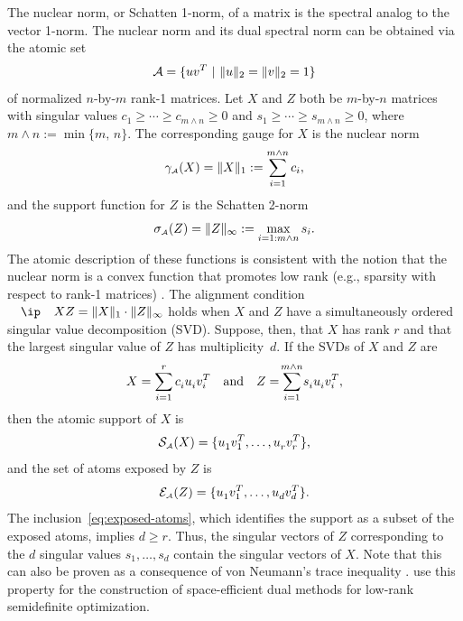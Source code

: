   \begin{example} \label{example-nuclear-norm}

    The nuclear norm, or Schatten 1-norm, of a matrix is the spectral analog to
    the vector 1-norm. The nuclear norm and its dual spectral norm can be obtained
    via the atomic set 
    \[
      \mathcal{A} = \{uv^T ~|~ \|u\|_2=\|v\|_2 = 1\}
    \]
    of normalized $n$-by-$m$ rank-1 matrices. Let $X$ and $Z$ both be $m$-by-$n$
    matrices with singular values $c_1\ge\cdots\ge c_{m\wedge n}\ge0$ and
    $s_1\ge\cdots\ge s_{m\wedge n}\ge0$, where $m\wedge n:=\min\{m,\, n\}$. The
    corresponding gauge for $X$ is the nuclear norm
    \[
      \gamma_{\scriptscriptstyle\mathcal{A}}(X) = \|X\|_1 := \sum_{i=1}^{m\wedge n}c_i,
    \]
    and the support function for $Z$ is the Schatten 2-norm
    \[
       \sigma_{\scriptscriptstyle\mathcal{A}}(Z) = \|Z\|_\infty:=\max_{i=1:m\wedge n}s_i.
    \]
    The atomic description of these functions is consistent with the notion that
    the nuclear norm is a convex function that promotes low rank (e.g., sparsity
    with respect to rank-1 matrices) \cite{recht2010guaranteed}. The alignment
    condition $\ip X Z = \norm{X}_1\cdot \norm{Z}_\infty$ holds when $X$ and $Z$
    have a simultaneously ordered singular value decomposition (SVD). Suppose,
    then, that $X$ has rank $r$ and that the largest singular value of $Z$ has
    multiplicity~$d$. If the SVDs of $X$ and $Z$ are
    \[
      X = \sum_{i=1}^r c^{}_i u^{}_iv_i^T
      \text{and}
      Z = \sum_{i=1}^{\mathclap{m\wedge n}} s^{}_iu^{}_iv_i^T,
    \]
    then the atomic support of $X$ is
    \[
      \operatorname{\mathcal{S}_{\scriptscriptstyle\mathcal{A}}}(X)=\{u^{}_1v_1^T,\ldots,u^{}_rv_r^T\},
     \]
    and the set of atoms exposed by $Z$ is
    \[
      \mathcal{E}_{\scriptscriptstyle\mathcal{A}}(Z)=\{u^{}_1v_1^T,\ldots,u^{}_dv_d^T\}.
    \]
    The inclusion~\eqref{eq:exposed-atoms}, which identifies the support as a subset of the
    exposed atoms, implies $d \geq r$. Thus, the singular vectors of $Z$
    corresponding to the $d$ singular values $s_1,\ldots,s_d$ contain the singular
    vectors of $X$. Note that this can also be proven as a consequence of von
    Neumann's trace inequality \cite{vonneumann:1937,lewis:1995}.
    \citet{friedlander2016low} use this property for the construction of
    space-efficient dual methods for low-rank semidefinite optimization.
  \end{example}

